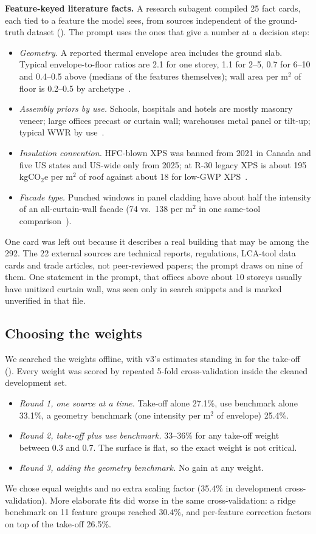 \documentclass[10pt,letterpaper]{article}
\begin{document}
\textbf{Feature-keyed literature facts.} A research subagent compiled 25 fact cards, each tied to a feature the model sees, from sources independent of the ground-truth dataset (). The prompt uses the ones that give a number at a decision step:
\begin{itemize}
\item \emph{Geometry.} A reported thermal envelope area includes the ground slab. Typical envelope-to-floor ratios are 2.1 for one storey, 1.1 for 2--5, 0.7 for 6--10 and 0.4--0.5 above (medians of the features themselves); wall area per m$^2$ of floor is 0.2--0.5 by archetype~\cite{pnnl}.
\item \emph{Assembly priors by use.} Schools, hospitals and hotels are mostly masonry veneer; large offices precast or curtain wall; warehouses metal panel or tilt-up; typical WWR by use~\cite{pnnl}.
\item \emph{Insulation convention.} HFC-blown XPS was banned from 2021 in Canada and five US states and US-wide only from 2025; at R-30 legacy XPS is about 195 kgCO$_2$e per m$^2$ of roof against about 18 for low-GWP XPS~\cite{oneclickxps}.
\item \emph{Facade type.} Punched windows in panel cladding have about half the intensity of an all-curtain-wall facade (74 vs.\ 138 per m$^2$ in one same-tool comparison~\cite{csa}).
\end{itemize}
One card was left out because it describes a real building that may be among the 292. The 22 external sources are technical reports, regulations, LCA-tool data cards and trade articles, not peer-reviewed papers; the prompt draws on nine of them. One statement in the prompt, that offices above about 10 storeys usually have unitized curtain wall, was seen only in search snippets and is marked unverified in that file.

\subsection{Choosing the weights}
We searched the weights offline, with v3's estimates standing in for the take-off (). Every weight was scored by repeated 5-fold cross-validation inside the cleaned development set.
\begin{itemize}
\item \emph{Round 1, one source at a time.} Take-off alone 27.1\%, use benchmark alone 33.1\%, a geometry benchmark (one intensity per m$^2$ of envelope) 25.4\%.
\item \emph{Round 2, take-off plus use benchmark.} 33--36\% for any take-off weight between 0.3 and 0.7. The surface is flat, so the exact weight is not critical.
\item \emph{Round 3, adding the geometry benchmark.} No gain at any weight.
\end{itemize}
We chose equal weights and no extra scaling factor (35.4\% in development cross-validation). More elaborate fits did worse in the same cross-validation: a ridge benchmark on 11 feature groups reached 30.4\%, and per-feature correction factors on top of the take-off 26.5\%.
\end{document}
